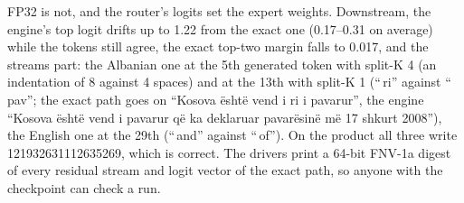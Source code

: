 \documentclass[11pt]{article}
\begin{document}
FP32 is not, and the router's logits set the expert weights. Downstream, the engine's top logit drifts up to 1.22 from the exact one (0.17--0.31
on average) while the tokens still agree, the exact top-two margin falls to 0.017, and the streams part: the Albanian one at
the 5th generated token with split-K 4 (an indentation of 8 against 4 spaces) and at the 13th with split-K 1 (``\,ri''
against ``\,pav''; the exact path goes on ``Kosova është vend i ri i pavarur'', the engine ``Kosova është vend i pavarur që
ka deklaruar pavarësinë më 17 shkurt 2008''), the English one at the 29th (``\,and'' against ``\,of''). On the product all
three write 121932631112635269, which is correct. The drivers print a 64-bit FNV-1a digest of every residual stream and
logit vector of the exact path, so anyone with the checkpoint can check a run.
\end{document}
